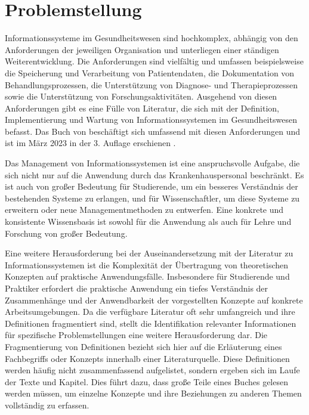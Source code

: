 \section{Problemstellung}\label{sec:problemstellung}
Informationssysteme im Gesundheitswesen sind hochkomplex, abhängig von den Anforderungen der jeweiligen Organisation und unterliegen einer ständigen Weiterentwicklung.
Die Anforderungen sind vielfältig und umfassen beispielsweise die Speicherung und Verarbeitung von Patientendaten, die Dokumentation von Behandlungsprozessen, die Unterstützung von Diagnose- und Therapieprozessen sowie die Unterstützung von Forschungsaktivitäten.
Ausgehend von diesen Anforderungen gibt es eine Fülle von Literatur, die sich mit der Definition, Implementierung und Wartung von Informationssystemen im Gesundheitswesen befasst.
Das Buch  von \citeauthor{bb} beschäftigt sich umfassend mit diesen Anforderungen und ist im März 2023 in der 3. Auflage erschienen \citep{bb}.\\

Das Management von Informationssystemen ist eine anspruchsvolle Aufgabe, die sich nicht nur auf die Anwendung durch das Krankenhauspersonal beschränkt.
Es ist auch von großer Bedeutung für Studierende, um ein besseres Verständnis der bestehenden Systeme zu erlangen, und für Wissenschaftler, um diese Systeme zu erweitern oder neue Managementmethoden zu entwerfen.
Eine konkrete und konsistente Wissensbasis ist sowohl für die Anwendung als auch für Lehre und Forschung von großer Bedeutung.\\

Eine weitere Herausforderung bei der Auseinandersetzung mit der Literatur zu Informationssystemen ist die Komplexität der Übertragung von theoretischen Konzepten auf praktische Anwendungsfälle.
Insbesondere für Studierende und Praktiker erfordert die praktische Anwendung ein tiefes Verständnis der Zusammenhänge und der Anwendbarkeit der vorgestellten Konzepte auf konkrete Arbeitsumgebungen.
Da die verfügbare Literatur oft sehr umfangreich und ihre Definitionen fragmentiert sind, stellt die Identifikation relevanter Informationen für spezifische Problemstellungen eine weitere Herausforderung dar.
Die Fragmentierung von Definitionen bezieht sich hier auf die Erläuterung eines Fachbegriffs oder Konzepts innerhalb einer Literaturquelle.
Diese Definitionen werden häufig nicht zusammenfassend aufgelistet, sondern ergeben sich im Laufe der Texte und Kapitel.
Dies führt dazu, dass große Teile eines Buches gelesen werden müssen, um einzelne Konzepte und ihre Beziehungen zu anderen Themen vollständig zu erfassen.\\

